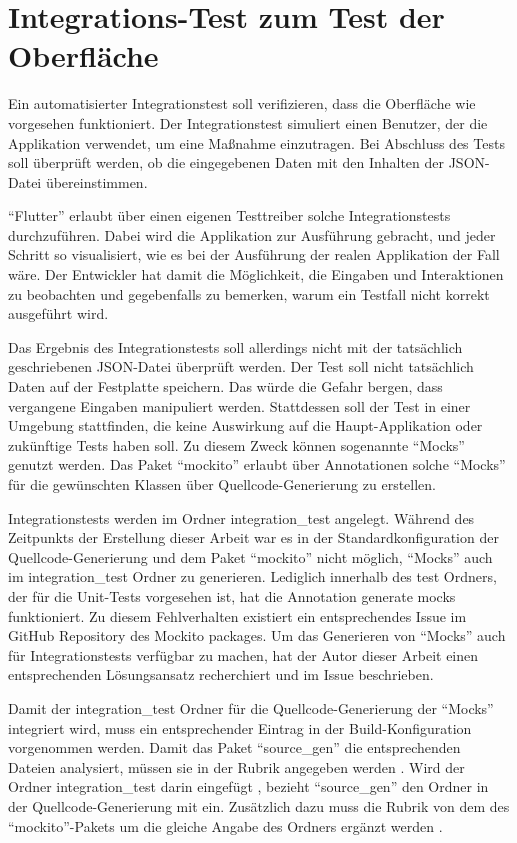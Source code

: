 


\section{Integrations-Test zum Test der Oberfläche}


Ein automatisierter Integrationstest soll verifizieren, dass die Oberfläche wie vorgesehen funktioniert.
Der Integrationstest simuliert einen Benutzer, der die Applikation verwendet, um eine Maßnahme einzutragen.
Bei Abschluss des Tests soll überprüft werden, ob die  eingegebenen Daten mit den Inhalten der JSON-Datei übereinstimmen.

\enquote{Flutter} erlaubt über einen eigenen Testtreiber solche Integrationstests durchzuführen.
Dabei wird die Applikation zur Ausführung gebracht, und jeder Schritt so visualisiert, wie es bei der Ausführung der realen Applikation der Fall wäre.
Der Entwickler hat damit die Möglichkeit, die Eingaben und Interaktionen zu beobachten und gegebenfalls zu bemerken, warum ein Testfall nicht korrekt ausgeführt wird.

Das Ergebnis des Integrationstests soll allerdings nicht mit der tatsächlich geschriebenen JSON-Datei überprüft werden.
Der Test soll nicht tatsächlich Daten auf der Festplatte speichern.
Das würde die Gefahr bergen, dass vergangene Eingaben manipuliert werden.
Stattdessen soll der Test in einer Umgebung stattfinden, die keine Auswirkung auf die Haupt-Applikation oder zukünftige Tests haben soll.
Zu diesem Zweck können sogenannte \enquote{Mocks} genutzt werden.
Das Paket \enquote{mockito} erlaubt über Annotationen solche \enquote{Mocks} für die gewünschten Klassen  über Quellcode-Generierung zu erstellen.

Integrationstests werden im Ordner integration_test angelegt.
Während des Zeitpunkts der Erstellung dieser Arbeit war es in der Standardkonfiguration der Quellcode-Generierung und dem Paket \enquote{mockito} nicht möglich, \enquote{Mocks} auch im integration_test Ordner zu generieren.  Lediglich innerhalb des test Ordners, der für die Unit-Tests vorgesehen ist, hat die Annotation generate mocks funktioniert. Zu diesem Fehlverhalten existiert ein entsprechendes Issue im GitHub Repository  des Mockito packages.  Um das Generieren von \enquote{Mocks} auch für Integrationstests verfügbar zu machen, hat der Autor dieser Arbeit einen entsprechenden Lösungsansatz recherchiert und im Issue beschrieben. 

Damit der integration_test Ordner für die Quellcode-Generierung der \enquote{Mocks} integriert wird, muss ein entsprechender Eintrag in der Build-Konfiguration vorgenommen werden.
Damit das Paket \enquote{source_gen} die entsprechenden Dateien analysiert, müssen sie in der Rubrik  angegeben werden .
Wird der Ordner integration_test darin eingefügt , bezieht \enquote{source_gen} den Ordner in der Quellcode-Generierung mit ein.
Zusätzlich dazu muss die Rubrik  von dem  des \enquote{mockito}-Pakets  um die gleiche Angabe des Ordners ergänzt werden .

